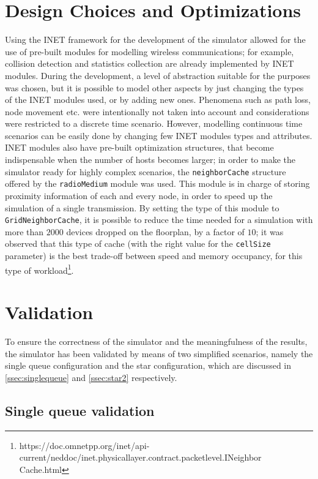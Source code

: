 \section{Design Choices and Optimizations}
Using the INET framework for the development of the simulator allowed for the use of pre-built modules for modelling wireless communications; for example,
collision detection and statistics collection are already implemented by INET
modules. During the development, a level of abstraction suitable for the purposes was chosen, but it is possible to model other aspects by just 
changing the types of the INET modules used, or by adding new ones. Phenomena such as path loss, node movement etc. were intentionally not taken into account and considerations were restricted to a discrete time scenario. However, modelling
continuous time scenarios can be easily done by changing few INET modules types
and attributes.\\
INET modules also have pre-built optimization structures, that become
indispensable when the number of hosts becomes larger; in order to make the
simulator ready for highly complex scenarios, the \texttt{neighborCache}
structure offered by the \texttt{radioMedium} module was used. This module is in charge
of storing proximity information of each and every node, in order to speed up the simulation of a single 
transmission. By setting the type of this module to \texttt{GridNeighborCache},
it is possible to reduce the time needed for a simulation with more than
$2000$ devices dropped on the floorplan, by a factor of $10$; it was observed that
this type of cache (with the right value for the \texttt{cellSize} parameter) is
the best trade-off between speed and memory occupancy, for this type of
workload\footnote{https://doc.omnetpp.org/inet/api-current/neddoc/inet.physicallayer.contract.packetlevel.INeighbor\\
Cache.html}.  

\section{Validation}
To ensure the correctness of the simulator and the meaningfulness of the results, the simulator has been validated by means of two simplified scenarios, namely the single queue configuration and the star configuration, which are discussed in \ref{ssec:singlequeue} and \ref{ssec:star2} respectively.

\subsection{Single queue validation}

